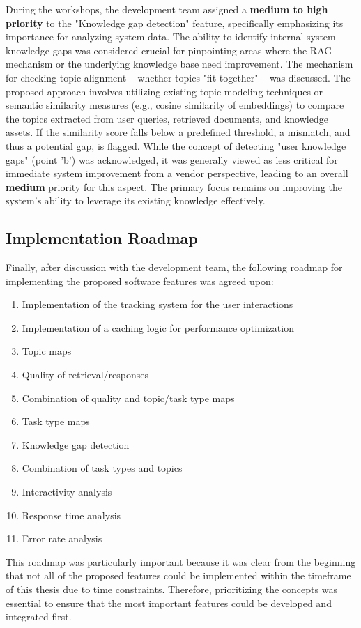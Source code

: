 \documentclass[
	english,
	ruledheaders=section,%
	class=report,%
	thesis={type=bachelor},%
	accentcolor=1b,%
	custommargins=true,%
	marginpar=false,%
	parskip=half-,%
	fontsize=11pt,%
	DIV=14,
]{tudapub}
\begin{document}
During the workshops, the development team assigned a \textbf{medium to high priority} to the "Knowledge gap detection" feature, specifically emphasizing its importance for analyzing system data. The ability to identify internal system knowledge gaps was considered crucial for pinpointing areas where the RAG mechanism or the underlying knowledge base need improvement. The mechanism for checking topic alignment -- whether topics "fit together" -- was discussed. The proposed approach involves utilizing existing topic modeling techniques or semantic similarity measures (e.g., cosine similarity of embeddings) to compare the topics extracted from user queries, retrieved documents, and knowledge assets. If the similarity score falls below a predefined threshold, a mismatch, and thus a potential gap, is flagged. While the concept of detecting "user knowledge gaps" (point 'b') was acknowledged, it was generally viewed as less critical for immediate system improvement from a vendor perspective, leading to an overall \textbf{medium} priority for this aspect. The primary focus remains on improving the system's ability to leverage its existing knowledge effectively.
\subsection{Implementation Roadmap}
Finally, after discussion with the development team, the following roadmap for implementing the proposed software features was agreed upon:
\begin{enumerate}
    \item Implementation of the tracking system for the user interactions
    \item Implementation of a caching logic for performance optimization
    \item Topic maps
    \item Quality of retrieval/responses
    \item Combination of quality and topic/task type maps
    \item Task type maps
    \item Knowledge gap detection
    \item Combination of task types and topics
    \item Interactivity analysis
    \item Response time analysis
    \item Error rate analysis
\end{enumerate}
This roadmap was particularly important because it was clear from the beginning that not all of the proposed features could be implemented within the timeframe of this thesis due to time constraints. Therefore, prioritizing the concepts was essential to ensure that the most important features could be developed and integrated first.
\end{document}
